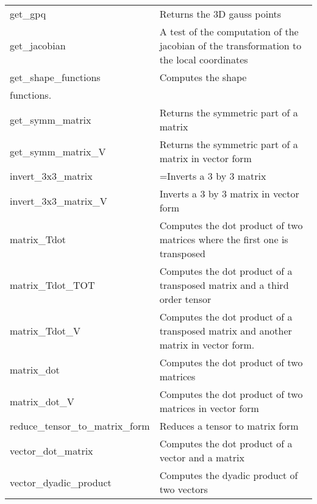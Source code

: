 \documentclass{asme2ej}
\begin{document}
\begin{longtable}{ p{}  p{} }
get\_gpq & Returns the 3D gauss points\\
get\_jacobian & A test of the computation of the jacobian of the transformation to the local coordinates\\
get\_shape\_functions &Computes the shape\\ functions.\\
get\_symm\_matrix & Returns the symmetric part of a matrix\\
get\_symm\_matrix\_V & Returns the symmetric part of a matrix in vector form\\
invert\_3x3\_matrix &=Inverts a 3 by 3 matrix\\
invert\_3x3\_matrix\_V & Inverts a 3 by 3 matrix in vector form\\
matrix\_Tdot & Computes the dot product of two matrices where the first one is transposed\\
matrix\_Tdot\_TOT & Computes the dot product of a transposed matrix and a third order tensor\\
matrix\_Tdot\_V & Computes the dot product of a transposed matrix and another matrix in vector form.\\
matrix\_dot & Computes the dot product of two matrices\\
matrix\_dot\_V & Computes the dot product of two matrices in vector form\\
reduce\_tensor\_to\_matrix\_form & Reduces a tensor to matrix form\\
vector\_dot\_matrix & Computes the dot product of a vector and a matrix\\
vector\_dyadic\_product & Computes the dyadic product of two vectors\\
\hline
\end{longtable}

\FloatBarrier



\end{document}
